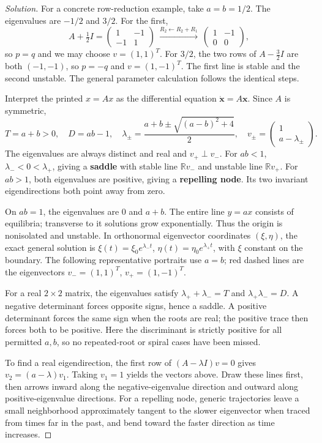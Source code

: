 \documentclass[10pt]{amsart}
\newenvironment{solution}
{\begin{proof}[Solution]}
{\end{proof}}
\begin{document}
\begin{enumerate}[label=\arabic*), leftmargin=*, itemsep=1em]
\begin{solution}
For a concrete row-reduction example, take $a=b=1/2$. The eigenvalues are $-1/2$ and $3/2$. For the first,
\[
A+\tfrac12 I=\begin{pmatrix}1&-1\\-1&1\end{pmatrix}
\ \xrightarrow{R_2\leftarrow R_2+R_1}\ 
\begin{pmatrix}1&-1\\0&0\end{pmatrix},
\]
so $p=q$ and we may choose $v=(1,1)^T$. For $3/2$, the two rows of $A-\tfrac32I$ are both $(-1,-1)$, so $p=-q$ and $v=(1,-1)^T$. The first line is stable and the second unstable. The general parameter calculation follows the identical steps.


Interpret the printed $x=Ax$ as the differential equation $\dot{\mathbf x}=A\mathbf x$. Since $A$ is symmetric,
\[
T=a+b>0,\quad D=ab-1,\quad
\lambda_\pm=\frac{a+b\pm\sqrt{(a-b)^2+4}}2,\quad
v_\pm=\begin{pmatrix}1\\a-\lambda_\pm\end{pmatrix}.
\]
The eigenvalues are always distinct and real and $v_+\perp v_-$. For $ab<1$, $\lambda_-<0<\lambda_+$, giving a \textbf{saddle} with stable line $\mathbb Rv_-$ and unstable line $\mathbb Rv_+$. For $ab>1$, both eigenvalues are positive, giving a \textbf{repelling node}. Its two invariant eigendirections both point away from zero.

On $ab=1$, the eigenvalues are $0$ and $a+b$. The entire line $y=ax$ consists of equilibria; transverse to it solutions grow exponentially. Thus the origin is nonisolated and unstable. In orthonormal eigenvector coordinates $(\xi,\eta)$, the exact general solution is $\xi(t)=\xi_0e^{\lambda_-t}$, $\eta(t)=\eta_0e^{\lambda_+t}$, with $\xi$ constant on the boundary. The following representative portraits use $a=b$; red dashed lines are the eigenvectors $v_-=(1,1)^T$, $v_+=(1,-1)^T$.

For a real $2\times2$ matrix, the eigenvalues satisfy $\lambda_++\lambda_-=T$ and $\lambda_+\lambda_-=D$. A negative determinant forces opposite signs, hence a saddle. A positive determinant forces the same sign when the roots are real; the positive trace then forces both to be positive. Here the discriminant is strictly positive for all permitted $a,b$, so no repeated-root or spiral cases have been missed.

To find a real eigendirection, the first row of $(A-\lambda I)v=0$ gives $v_2=(a-\lambda)v_1$. Taking $v_1=1$ yields the vectors above. Draw these lines first, then arrows inward along the negative-eigenvalue direction and outward along positive-eigenvalue directions. For a repelling node, generic trajectories leave a small neighborhood approximately tangent to the slower eigenvector when traced from times far in the past, and bend toward the faster direction as time increases.


\end{solution}
\end{enumerate}
\end{document}
